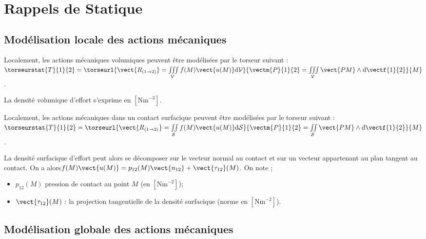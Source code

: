 \setchapterpreamble[u]{\margintoc}

\chapter{Rappels de Statique}




\section{Modélisation locale des actions mécaniques}
\begin{defi}
Localement, les actions mécaniques volumiques peuvent être modélisées par le torseur suivant :
$
\torseurstat{T}{1}{2}=
\torseurl{%
\vect{R_{(1\rightarrow 2)}} 
= \iiint\limits_{\mathcal{V}} f(M) \vect{u(M)} \text{d}\mathcal{V}}{%
\vectm{P}{1}{2} = \iiint\limits_{\mathcal{V}}\vect{PM}\wedge \text{d}\vectf{1}{2}}{M}
$.

La densité volumique d'effort s'exprime en $\left[\text{Nm}^{-3}\right]$.
\end{defi}

\begin{defi}
Localement, les actions mécaniques dans un contact surfacique peuvent être modélisées par le torseur suivant :
$
\torseurstat{T}{1}{2}=
\torseurl{%
\vect{R_{(1\rightarrow 2)}} 
= \iint\limits_{\mathcal{S}} f(M) \vect{u(M)} \text{d}\mathcal{S}}{%
\vectm{P}{1}{2} = \iint\limits_{\mathcal{S}}\vect{PM}\wedge \text{d}\vectf{1}{2}}{M}
$.

La densité surfacique d'effort peut alors se décomposer sur le vecteur normal au contact et sur un vecteur appartenant au plan tangent au contact. On a alors$f(M) \vect{u(M)} = p_{12}(M)\vect{n_{12}}+\vect{\tau_{12}}(M)$. 
On note ;
\begin{itemize}
\item $p_{12}(M)$ pression de contact au point $M$ (en $\left[\text{Nm}^{-2}\right]$);
\item $\vect{\tau_{12}}(M)$ : la projection tangentielle de la densité surfacique (norme en $\left[\text{Nm}^{-2}\right]$).
\end{itemize}
\end{defi}

\section{Modélisation globale des actions mécaniques}


